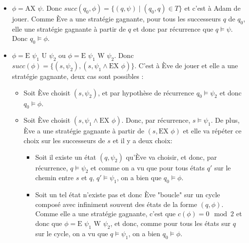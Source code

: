 \documentclass[10pt,a4paper]{article}
\begin{document}
\begin{itemize}
\item $\phi = \mbox{AX } \psi$. Donc $succ(q_0, \phi) = \{ (q, \psi) \mid (q_0,q) \in T \} $ et c'est à Adam de jouer. Comme Ève a une stratégie gagnante, pour tous les successeurs $q$ de $q_0$, elle une stratégie gagnante à partir de $q$ et donc par récurrence que $q \vDash \psi$. Donc $q_0 \vDash \phi$.

\item $\phi = \mbox{E } \psi_1 \mbox{ U } \psi_2$ ou $\phi = \mbox{E } \psi_1 \mbox{ W } \psi_2$. Donc $succ(\phi) = \{ (s,\psi_2), (s, \psi_1 \land \mbox{EX } \phi) \}$. C'est à Ève de jouer et elle a une stratégie gagnante, deux cas sont possibles :
\begin{itemize}
	\item Soit Ève choisit $(s,\psi_2)$, et par hypothèse de récurrence $q_0 \vDash \psi_2$ et donc $q_0 \vDash \phi$.
	\item Soit Ève choisit $(s, \psi_1 \land \mbox{EX } \phi)$. Donc, par récurrence, $s \vDash \psi_1$. De plus, Ève a une stratégie gagnante à partir de $(s,\mbox{EX } \phi)$ et
	elle va répéter ce choix sur les successeurs de $s$ et il y a deux choix:
	\begin{itemize}
		\item Soit il existe un état $(q,\psi_2)$ qu'Ève va choisir, et donc, par récurrence, $q \vDash \psi_2$ et comme on a vu que pour tous états $q'$ sur le chemin entre $s$ et $q$, $q' \vDash \psi_1$, on a bien que $q_0 \vDash \phi$.
		\item Soit un tel état n'existe pas et donc Ève "boucle" sur un cycle composé avec infiniment souvent des états de la forme $(q,\phi)$. Comme elle a une stratégie gagnante, c'est que $c(\phi) = 0 \mod 2$ et donc que $\phi = \mbox{E } \psi_1 \mbox{ W } \psi_2 $, et donc, comme pour tous les états sur $q$ sur le cycle, on a vu que $q \vDash \psi_1$, on a bien $q_0 \vDash \phi$.
	\end{itemize}
\end{itemize}


\end{itemize}
\end{document}
